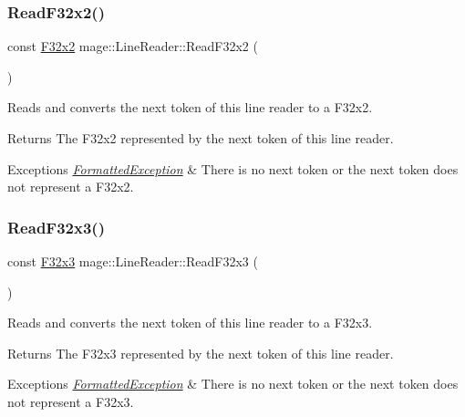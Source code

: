 \subsubsection{\texorpdfstring{Read\+F32x2()}{ReadF32x2()}}
{\footnotesize\ttfamily const \hyperlink{namespacemage_aa87237ad091f5cd7da612b8523fc108f}{F32x2} mage\+::\+Line\+Reader\+::\+Read\+F32x2 (\begin{DoxyParamCaption}{ }\end{DoxyParamCaption})\hspace{0.3cm}{\ttfamily [protected]}}

Reads and converts the next token of this line reader to a {\ttfamily F32x2}.

\begin{DoxyReturn}{Returns}
The {\ttfamily F32x2} represented by the next token of this line reader. 
\end{DoxyReturn}

\begin{DoxyExceptions}{Exceptions}
{\em \hyperlink{classmage_1_1_formatted_exception}{Formatted\+Exception}} & There is no next token or the next token does not represent a {\ttfamily F32x2}. \\
\hline
\end{DoxyExceptions}
\hypertarget{classmage_1_1_line_reader_a71a34d44de469a9c646c52050492ac01}{}\label{classmage_1_1_line_reader_a71a34d44de469a9c646c52050492ac01} 
\subsubsection{\texorpdfstring{Read\+F32x3()}{ReadF32x3()}}
{\footnotesize\ttfamily const \hyperlink{namespacemage_a73fbe0da4b8d5bc156bb8453e5b63a17}{F32x3} mage\+::\+Line\+Reader\+::\+Read\+F32x3 (\begin{DoxyParamCaption}{ }\end{DoxyParamCaption})\hspace{0.3cm}{\ttfamily [protected]}}

Reads and converts the next token of this line reader to a {\ttfamily F32x3}.

\begin{DoxyReturn}{Returns}
The {\ttfamily F32x3} represented by the next token of this line reader. 
\end{DoxyReturn}

\begin{DoxyExceptions}{Exceptions}
{\em \hyperlink{classmage_1_1_formatted_exception}{Formatted\+Exception}} & There is no next token or the next token does not represent a {\ttfamily F32x3}. \\
\hline
\end{DoxyExceptions}
\hypertarget{classmage_1_1_line_reader_a67cef487732b6c107dab669f3b661fd4}{}\label{classmage_1_1_line_reader_a67cef487732b6c107dab669f3b661fd4} 
